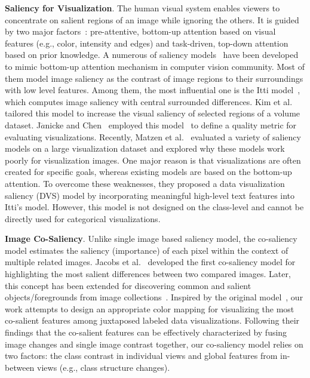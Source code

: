 \vspace{1.5mm}
\noindent\textbf{Saliency for Visualization}.
The human visual system enables viewers to concentrate on salient regions of an image while ignoring the others. It is guided by two major factors~\cite{connor2004visual}: pre-attentive, bottom-up attention based on visual features (e.g., color, intensity and edges) and task-driven, top-down attention based on prior knowledge. %
A numerous of saliency models~\cite{borji2019salient} have been developed to mimic bottom-up attention mechanism in computer vision community.
Most of them model image saliency as the contrast of image regions to their surroundings with low level features. Among them, the most influential one is the Itti model~\cite{Itti98}, which computes image saliency with central surrounded differences. Kim et al.~\cite{Kim06} tailored this model to increase the visual saliency of selected regions of a volume dataset.  J$\ddot{a}$nicke and Chen~\cite{Janicke10} employed this model~\cite{Itti98} to define a quality metric for evaluating visualizations.
Recently, Matzen et al.~\cite{Matzen18} evaluated a variety of saliency models on a large visualization dataset and explored why these models work poorly for visualization images. One major reason is that visualizations are often created for specific goals, whereas existing models are based on the bottom-up attention. To overcome these weaknesses, they proposed a data visualization saliency (DVS) model by incorporating meaningful high-level text features into Itti's model. However, this model is not designed on the class-level and cannot be directly used for categorical visualizations.



%
\vspace{1.5mm}
\noindent\textbf{Image Co-Saliency}.
Unlike single image based saliency model, the co-saliency model estimates the saliency (importance) of each pixel within the context of multiple related images. Jacobs et al.~\cite{Jacobs10} developed the first co-saliency model for highlighting the most salient differences between two compared images.  Later, this concept has been extended for discovering common and salient objects/foregrounds from image collections~\cite{zhang2018review}. Inspired by the original model~\cite{Jacobs10}, our work attempts to design an appropriate color mapping for visualizing the most co-salient features among juxtaposed labeled data visualizations. Following their findings that the co-salient features can be effectively characterized by fusing image changes and single image contrast together, our co-saliency model relies on two factors: the class contrast in individual views  and global features from in-between views (e.g., class structure changes).
